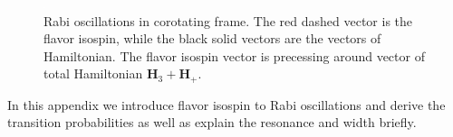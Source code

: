 \documentclass[%
reprint,
 amsmath,amssymb,
 prd,
]{revtex4-1}
\begin{document}
\begin{figure}
        \centering
        \includegraphics[width=\columnwidth, trim={20cm 10cm 50cm 10cm},clip]{assets/rabi-isospin-rotating-frame}
    \caption{Rabi oscillations in corotating frame. The red dashed vector is the flavor isospin, while the black solid vectors are the vectors of Hamiltonian. The flavor isospin vector is precessing around vector of total Hamiltonian $\mathbf{H}_3+\mathbf{H}_+$.}
    \label{fig-rabi-isospin-rotating-frame}
\end{figure}

In this appendix we introduce flavor isospin \cite{Duan2006a} to Rabi oscillations and derive the transition probabilities as well as explain the resonance and width briefly.
\end{document}
